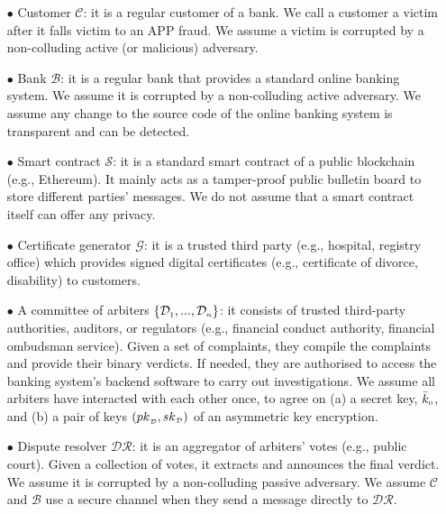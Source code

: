 \begin{itemize}
%
\item[$\bullet$] Customer $\mathcal{C}$: it is a regular customer of a bank. We call a customer  a victim after it falls victim to an APP fraud. We assume a victim is corrupted by a non-colluding active (or malicious) adversary. %
%
\item[$\bullet$] Bank $\mathcal{B}$: it is a regular bank that provides a standard online banking system. We assume it is corrupted by a non-colluding active adversary. We assume  any change to the source code of the online banking system is transparent and  can be detected. 


%
\item[$\bullet$] Smart contract $\mathcal{S}$: it is a standard  smart contract of a public  blockchain (e.g., Ethereum). It mainly acts as a tamper-proof public bulletin board to store different parties' messages.  We do not assume that a smart contract itself can offer any privacy. 
%
\item[$\bullet$] Certificate generator $\mathcal{G}$: it is a trusted third party (e.g., hospital, registry office) which provides signed digital certificates (e.g., certificate of   divorce, disability) to customers. %
%
\item[$\bullet$]  A committee of arbiters $\{\mathcal{D}_{\scriptscriptstyle 1},..., \mathcal{D}_{\scriptscriptstyle n}\}$: it consists of  trusted third-party authorities, auditors, or regulators (e.g.,  financial conduct authority, financial ombudsman service). Given a set of complaints, they compile the complaints    and provide  their binary verdicts. If needed, they are authorised to access the banking  system's backend software to carry out investigations. We assume all arbiters have interacted with each other once,  to agree on (a) a secret key, $\bar k_{\scriptscriptstyle 0}$, and (b) a pair of keys $({pk}_{\scriptscriptstyle\mathcal {D}}, {sk}_{\scriptscriptstyle\mathcal {D}})$  of an asymmetric key encryption.
%
\item[$\bullet$]  Dispute resolver $\mathcal{DR}$: it is an aggregator of arbiters' votes (e.g., public court). Given a collection of votes, it extracts and announces the final verdict. We assume it is corrupted by a non-colluding passive adversary. We assume $\mathcal C$ and $\mathcal B$  use a secure channel when they  send a message directly to $\mathcal{DR}$. 
%
\end{itemize}



